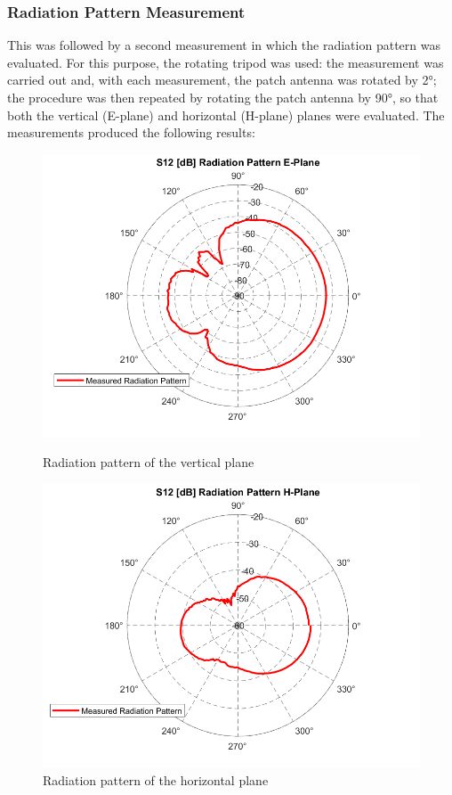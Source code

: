 \documentclass[]{article}
\begin{document}
\subsubsection{Radiation Pattern Measurement}
This was followed by a second measurement in which the radiation pattern was evaluated. For this purpose, the rotating tripod was used: the measurement was carried out and, with each measurement, the patch antenna was rotated by 2°; the procedure was then repeated by rotating the patch antenna by 90°, so that both the vertical (E-plane) and horizontal (H-plane) planes were evaluated.
The measurements produced the following results: 
\begin{figure}[H]
	\centering
	\begin{minipage}{0.41\linewidth}
		\centering
		\includegraphics[width=\linewidth]{img/S12_vs_angle_rad_pattern_no_comp_eplane_small}
		\caption{Radiation pattern of the vertical plane}
		\label{Epln-solo}
	\end{minipage}\hspace{0.1\linewidth}
	\begin{minipage}{0.42\linewidth}
		\centering
		\includegraphics[width=\linewidth]{img/S12_vs_angle_rad_pattern_no_comp_hplane_small}
		\caption{Radiation pattern of the horizontal plane}
		\label{Hpln-solo}
	\end{minipage}
\end{figure}
\end{document}
